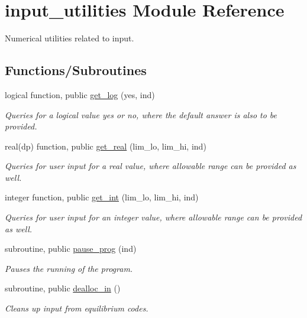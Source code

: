 \hypertarget{namespaceinput__utilities}{}\section{input\+\_\+utilities Module Reference}
\label{namespaceinput__utilities}


Numerical utilities related to input.  


\subsection*{Functions/\+Subroutines}
\begin{DoxyCompactItemize}
\item 
logical function, public \hyperlink{namespaceinput__utilities_ad9ce824c30b32041ab70f3fb191f06db}{get\+\_\+log} (yes, ind)
\begin{DoxyCompactList}\small\item\em Queries for a logical value yes or no, where the default answer is also to be provided. \end{DoxyCompactList}\item 
real(dp) function, public \hyperlink{namespaceinput__utilities_a41fc0c806e12bc722771210cfa1edbd3}{get\+\_\+real} (lim\+\_\+lo, lim\+\_\+hi, ind)
\begin{DoxyCompactList}\small\item\em Queries for user input for a real value, where allowable range can be provided as well. \end{DoxyCompactList}\item 
integer function, public \hyperlink{namespaceinput__utilities_a03e09af96ba6f7e187ea4a1d9b743148}{get\+\_\+int} (lim\+\_\+lo, lim\+\_\+hi, ind)
\begin{DoxyCompactList}\small\item\em Queries for user input for an integer value, where allowable range can be provided as well. \end{DoxyCompactList}\item 
subroutine, public \hyperlink{namespaceinput__utilities_a71bd36f063d55ab62c7a37864aef1185}{pause\+\_\+prog} (ind)
\begin{DoxyCompactList}\small\item\em Pauses the running of the program. \end{DoxyCompactList}\item 
subroutine, public \hyperlink{namespaceinput__utilities_aa0cf7578f9c9ab6470f8bb8d025f1daf}{dealloc\+\_\+in} ()
\begin{DoxyCompactList}\small\item\em Cleans up input from equilibrium codes. \end{DoxyCompactList}\end{DoxyCompactItemize}


